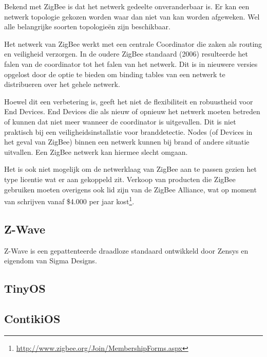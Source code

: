 \documentclass{../local}
\begin{document}
Bekend met ZigBee is dat het netwerk gedeelte onveranderbaar is. Er kan een netwerk topologie gekozen worden waar dan niet van kan worden afgeweken. Wel alle belangrijke soorten topologieën zijn beschikbaar.

Het netwerk van ZigBee werkt met een centrale Coordinator die zaken als routing en veiligheid verzorgen. In de oudere ZigBee standaard (2006) resulteerde het falen van de coordinator tot het falen van het netwerk. Dit is in nieuwere versies opgelost door de optie te bieden om binding tables van een netwerk te distribueren over het gehele netwerk.

Hoewel dit een verbetering is, geeft het niet de flexibiliteit en robuustheid voor End Devices. End Devices die als nieuw of opnieuw het netwerk moeten betreden of kunnen dat niet meer wanneer de coordinator is uitgevallen. Dit is niet praktisch bij een veiligheidsinstallatie voor branddetectie. Nodes (of Devices in het geval van ZigBee) binnen een netwerk kunnen bij brand of andere situatie uitvallen. Een ZigBee netwerk kan hiermee slecht omgaan.

Het is ook niet mogelijk om de netwerklaag van ZigBee aan te passen gezien het type licentie wat er aan gekoppeld zit. Verkoop van producten die ZigBee gebruiken moeten overigens ook lid zijn van de ZigBee Alliance, wat op moment van schrijven vanaf \$4.000 per jaar kost\footnote{\url{http://www.zigbee.org/Join/MembershipForms.aspx}}.

\subsection{Z-Wave}
Z-Wave is een gepattenteerde draadloze standaard ontwikkeld door Zensys en eigendom van Sigma Designs.
\subsection{TinyOS}


\subsection{ContikiOS}
\end{document}
